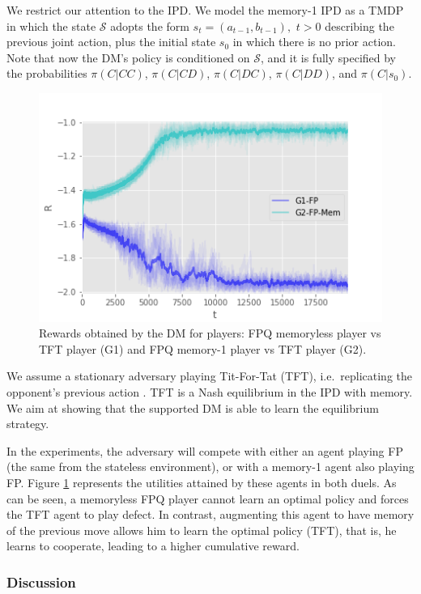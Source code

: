 We restrict our attention to the IPD. We model the memory-1 IPD as a TMDP in which the state $\mathcal{S}$ adopts the form $s_t = (a_{t-1}, b_{t-1}), \,\,  t > 0$
describing the previous joint action, plus the initial state $s_0$ in which there
is no prior action. Note that now the DM's policy is conditioned on
$\mathcal{S}$, and it is fully specified by the probabilities
$\pi(C | CC)$, $\pi(C | CD)$, $\pi(C | DC)$, $\pi(C | DD)$, and  $\pi(C | s_0)$.

\begin{figure}[h!]
\centering
\includegraphics[scale=0.5]{figures/MemvsTFT_G1}%
\caption{Rewards obtained by the DM for players: FPQ memoryless player vs TFT player (G1) and FPQ memory-1 player vs TFT player (G2).}\label{fig:Mem1}
\end{figure}

\noindent We assume a stationary adversary playing Tit-For-Tat (TFT), i.e.\ replicating
the opponent's previous action \cite{axelrod84}. TFT is a Nash equilibrium in the IPD with memory.
We aim at showing that the supported DM is able to learn the equilibrium strategy. 

In the experiments, the adversary will compete with either an agent playing FP (the same from the stateless environment), or with a memory-1 agent also playing FP. Figure \ref{fig:Mem1} represents the utilities attained by these agents in both duels. As can be seen, a memoryless FPQ player cannot learn an optimal policy and forces the TFT agent to play defect. In contrast, augmenting this agent to have memory of the previous move allows him to learn the optimal policy (TFT), that is, he learns to cooperate, leading to a higher cumulative reward.

\subsubsection{Discussion}

